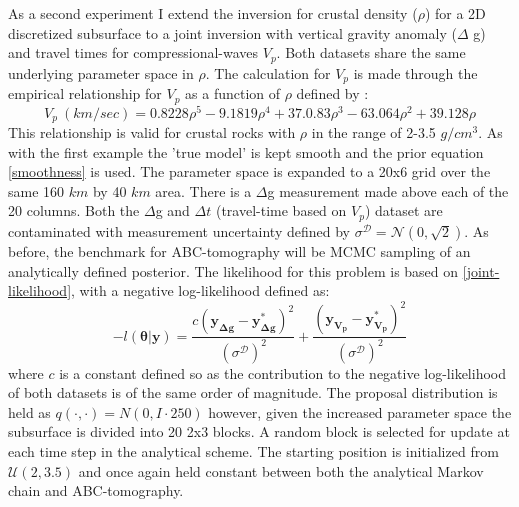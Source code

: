 As a second experiment I extend the inversion for crustal density ($\rho$) for a 2D discretized subsurface to a joint inversion with vertical gravity anomaly ($\Delta$ g) and travel times for compressional-waves $V_p$. Both datasets share the same underlying parameter space in $\rho$. The calculation for $V_p$ is made through the empirical relationship for $V_p$ as a function of $\rho$ defined by \citet{Brocher2005}:
\begin{equation}
	V_p\ (km/sec) = 0.8228\rho^5 - 9.1819\rho^4 + 37.0.83\rho^3 - 63.064\rho^2 + 39.128\rho
	\label{rhotovp}
\end{equation}
This relationship is valid for crustal rocks with $\rho$ in the range of 2-3.5 $g/cm^3$. As with the first example the 'true model' is kept smooth and the prior equation \ref{smoothness} is used. The parameter space is expanded to a 20x6 grid over the same 160 $km$ by 40 $km$ area. There is a $\Delta$g measurement made above each of the 20 columns. Both the $\Delta$g and $\Delta t$ (travel-time based on $V_p$) dataset are contaminated with measurement uncertainty defined by $\sigma^{\mathcal{D}} = \mathcal{N}(0,\sqrt{2})$. As before, the benchmark for ABC-tomography will be MCMC sampling of an analytically defined posterior. The likelihood for this problem is based on \ref{joint-likelihood}, with a negative log-likelihood defined as:
\begin{equation}
	-l(\bm{\theta}|\bm{y}) = \frac{c(\bm{y_{\Delta g}}-\bm{y^*_{\Delta g}})^2}{(\sigma^{\mathcal{D}})^2} + \frac{(\bm{y_{V_p}}-\bm{y^*_{V_p}})^2}{(\sigma^{\mathcal{D}})^2}
\end{equation}
where $c$ is a constant defined so as the contribution to the negative log-likelihood of both datasets is of the same order of magnitude. The proposal distribution is held as $q(\cdot,\cdot) = N(0,I\cdot250)$ however, given the increased parameter space the subsurface is divided into 20 2x3 blocks. A random block is selected for update at each time step in the analytical scheme. The starting position is initialized from $\mathcal{U}(2,3.5)$  and once again held constant between both the analytical Markov chain and ABC-tomography. \par

